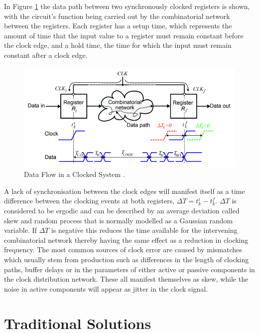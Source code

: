 \documentclass[11pt,english,british]{report}
\begin{document}
In Figure \ref{fig:eldar_why_precise_clocking} the data path between two synchronously clocked registers is shown, with the circuit's function being carried out by the combinatorial network between the registers.
Each register has a setup time, which represents the amount of time that the input value to a register must remain constant before the clock edge, and a hold time, the time for which the input must remain constant after a clock edge.
\begin{figure}[h]
	\centering
	\includegraphics[scale=0.5]{../eldar_why_precise_clocking}
	\caption{Data Flow in a Clocked System \cite{zianbetov2013distributed}.}
	\label{fig:eldar_why_precise_clocking}
\end{figure}\newline
A lack of synchronisation between the clock edges will manifest itself as a time difference between the clocking events at both registers, $\Delta T = t^i_k - t^f_k$. $\Delta T$ is considered to be ergodic and can be described by an average deviation called skew and random process that is normally modelled as a Gaussian random variable. If $\Delta T$ is negative this reduces the time available for the intervening combinatorial network thereby having the same effect as a reduction in clocking frequency.
The most common sources of clock error are caused by mismatches which usually stem from production such as differences in the length of clocking paths, buffer delays or in the parameters of either active or passive components in the clock distribution network. These all manifest themselves as skew, while the noise in active components will appear as jitter in the clock signal.

\section{Traditional Solutions}
\end{document}
